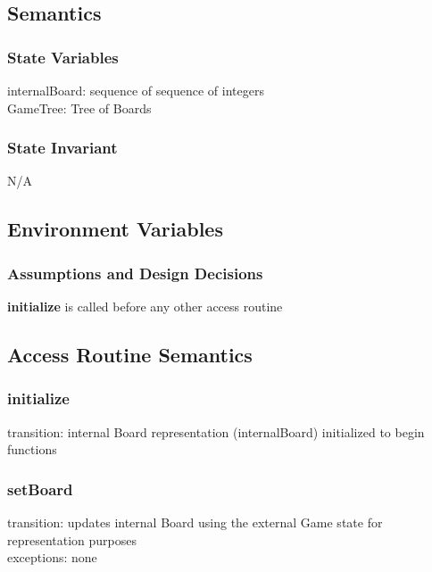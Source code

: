 \documentclass{article}
\begin{document}
    \subsection*{Semantics}
        \subsubsection*{State Variables}
            internalBoard: sequence of sequence of integers\\
            GameTree: Tree of Boards\\
            
        \subsubsection*{State Invariant}
            N/A
            
    \subsection*{Environment Variables}
            
        \subsubsection*{Assumptions and Design Decisions}
            \textbf{initialize} is called before any other access routine
            
    \subsection*{Access Routine Semantics}
    \subsubsection*{initialize} 
            transition: internal Board representation (internalBoard) initialized to begin functions\\
            
        \subsubsection*{setBoard} 
            transition: updates internal Board using the external Game state for representation purposes\\
            exceptions: none
        
\end{document}
